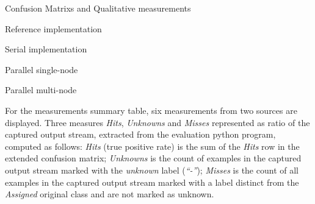 %   

\begin{table}[htb]
\caption{Confusion Matrixs and Qualitative measurements}
\label{tab:confusion-matrixes-ref-serial}
\begin{subtable}[h]{\textwidth}\begin{center}
    \caption{Reference implementation}
    
    \label{tab:java-matrix}
\end{center}\end{subtable}
\begin{subtable}[h]{\textwidth}\begin{center}
    \whencolumns{}{\vspace{5mm}}
    \caption{Serial implementation}
    
    \label{tab:libc-matrix}
    \whencolumns{}{\vspace{5mm}}
\end{center}\end{subtable}
\begin{subtable}[h]{0.5\textwidth}\begin{center}
  \caption{Parallel single-node}
  
  \label{tab:single-node-matrix}
\end{center}\end{subtable}
\begin{subtable}[h]{0.5\textwidth}\begin{center}
  \caption{Parallel multi-node}
  
  \label{tab:multi-node-matrix}
\end{center}\end{subtable}
\end{table}

For the measurements summary table, six measurements from two sources are displayed. Three
measures \emph{Hits}, \emph{Unknowns} and \emph{Misses} represented as ratio of
the captured output stream, extracted from the evaluation python program,
computed as follows:
\emph{Hits} (true positive rate) is the sum of the \emph{Hits} row in the
extended confusion matrix;
\emph{Unknowns} is the count of examples in the captured output stream marked
with the \emph{unknown} label (\emph{``-''});
\emph{Misses} is the count of all examples in the captured output stream marked
with a label distinct from the \emph{Assigned} original class and are not marked
as unknown.

